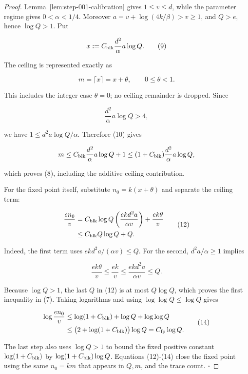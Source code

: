\begin{proof}
Lemma~\ref{lem:step-001-calibration} gives
\(1\le v\le d\), while the parameter regime gives
\(0<\alpha<1/4\). Moreover \(a=v+\log(4k/\beta)>v\ge1\), and
\(Q>e\), hence \(\log Q>1\). Put

\[
 x:=C_{\rm blk}\frac{d^2}{\alpha}a\log Q.
\tag{9}
\]

The ceiling is represented exactly as

\[
 m=\lceil x\rceil=x+\theta,
 \qquad 0\le\theta<1.
\tag{10}
\]

This includes the integer case \(\theta=0\); no ceiling remainder is
dropped. Since

\[
 \frac{d^2}{\alpha}a\log Q>4,
\tag{11}
\]

we have \(1\le d^2a\log Q/\alpha\). Therefore (10) gives

\[
 m\le
 C_{\rm blk}\frac{d^2}{\alpha}a\log Q+1
 \le(1+C_{\rm blk})\frac{d^2}{\alpha}a\log Q,
\]

which proves (8), including the additive ceiling contribution.

For the fixed point itself, substitute \(n_0=k(x+\theta)\) and separate the
ceiling term:

\[
\begin{aligned}
 \frac{en_0}{v}
 &=C_{\rm blk}\log Q
   \left(\frac{ekd^2a}{\alpha v}\right)
   +\frac{ek\theta}{v}\\
 &\le C_{\rm blk}Q\log Q+Q.
\end{aligned}
\tag{12}
\]

Indeed, the first term uses
\(ekd^2a/(\alpha v)\le Q\). For the second,
\(d^2a/\alpha\ge1\) implies

\[
 \frac{ek\theta}{v}\le\frac{ek}{v}
 \le\frac{ekd^2a}{\alpha v}\le Q.
\tag{13}
\]

Because \(\log Q>1\), the last \(Q\) in (12) is at most \(Q\log Q\),
which proves the first inequality in (7). Taking logarithms and using
\(\log\log Q\le\log Q\) gives

\[
\begin{aligned}
 \log\frac{en_0}{v}
 &\le\log(1+C_{\rm blk})+\log Q+\log\log Q\\
 &\le\bigl(2+\log(1+C_{\rm blk})\bigr)\log Q
 =C_{\rm fp}\log Q.
\end{aligned}
\tag{14}
\]

The last step also uses \(\log Q>1\) to bound the fixed positive constant
\(\log(1+C_{\rm blk})\) by
\(\log(1+C_{\rm blk})\log Q\). Equations (12)-(14) close the fixed point
using the same \(n_0=km\) that appears in \(Q,m\), and the trace count.
\(\square\)


\end{proof}

